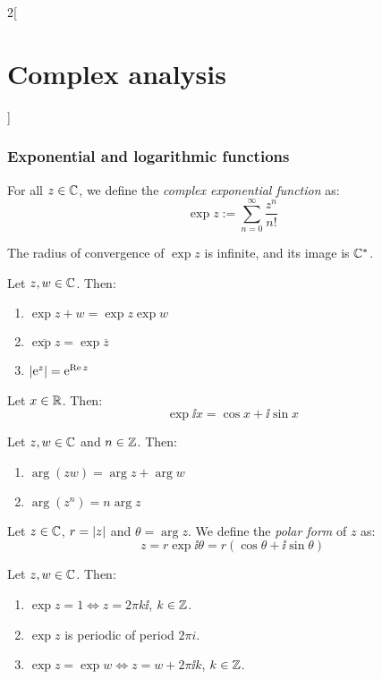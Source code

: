 \documentclass[../../../main.tex]{subfiles}
\begin{document}
\begin{multicols}{2}[\section{Complex analysis}]
  \subsubsection{Exponential and logarithmic functions}
  \begin{definition}
    For all $z \in \mathbb{C}$, we define the \textit{complex exponential function} as: $$\exp{z}:=\sum_{n=0}^\infty\frac{z^n}{n!}$$
  \end{definition}
  \begin{proposition}
    The radius of convergence of $\exp{z}$ is infinite, and its image is $\mathbb{C}^*$.
  \end{proposition}
  \begin{proposition}
    Let $z,w\in\mathbb{C}$. Then:
    \begin{enumerate}
      \item $\exp{z+w}=\exp{z}\exp{w}$
      \item $\overline{\exp{z}}=\exp{\overline{z}}$
      \item $\abs{\mathrm{e}^{z}}=\mathrm{e}^{\Re z}$
    \end{enumerate}
  \end{proposition}
  \begin{corollary}
    Let $x\in\mathbb{R}$. Then: $$\exp{\ii x}=\cos x+\ii \sin x$$
  \end{corollary}
  \begin{proposition}
    Let $z, w \in \mathbb{C}$ and $n\in\mathbb{Z}$. Then:
    \begin{enumerate}
      \item $\arg(zw) = \arg z + \arg w$
      \item $\arg(z^n) = n \arg{z}$
    \end{enumerate}
  \end{proposition}
  \begin{definition}
    Let $z\in\mathbb{C}$, $r=\abs{z}$ and $\theta=\arg z$. We define the \emph{polar form} of $z$ as: $$z = r\exp{\ii\theta}=r(\cos{\theta} + \ii\sin{\theta})$$
  \end{definition}
  \begin{corollary}
    Let $z,w\in\mathbb{C}$. Then:
    \begin{enumerate}
      \item $\exp{z}=1\iff z=2\pi k\ii$, $k\in\mathbb{Z}$.
      \item $\exp{z}$ is periodic of period $2\pi i$.
      \item $\exp{z}=\exp{w}\iff z=w+2\pi \ii k$, $k\in\mathbb{Z}$.
    \end{enumerate}

\end{corollary}
\end{multicols}
\end{document}
